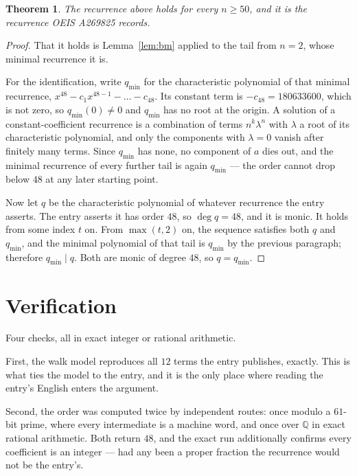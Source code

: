 \documentclass[11pt,a4paper]{article}
\theoremstyle{plain}
\newtheorem{theorem}{Theorem}
\theoremstyle{definition}
\begin{document}
\begin{theorem}
The recurrence above holds for every $n\ge50$, and it is the recurrence OEIS A269825 records.
\end{theorem}

\begin{proof}
That it holds is Lemma~\ref{lem:bm} applied to the tail from $n=2$, whose minimal
recurrence it is.

For the identification, write $q_{\min}$ for the characteristic polynomial of that minimal
recurrence, $x^{48}-c_1x^{48-1}-\dots-c_{48}$. Its constant term is
$-c_{48}=180633600$, which is not zero, so $q_{\min}(0)\neq0$ and $q_{\min}$ has no
root at the origin. A solution of a constant-coefficient recurrence is a combination of terms
$n^{k}\lambda^{n}$ with $\lambda$ a root of its characteristic polynomial, and only the
components with $\lambda=0$ vanish after finitely many terms. Since $q_{\min}$ has none, no
component of $a$ dies out, and the minimal recurrence of every further tail is again
$q_{\min}$ --- the order cannot drop below $48$ at any later starting point.

Now let $q$ be the characteristic polynomial of whatever recurrence the entry asserts. The
entry asserts it has order $48$, so $\deg q=48$, and it is monic. It holds from some
index $t$ on. From $\max(t,2)$ on, the sequence satisfies both $q$ and $q_{\min}$, and
the minimal polynomial of that tail is $q_{\min}$ by the previous paragraph; therefore
$q_{\min}\mid q$. Both are monic of degree $48$, so $q=q_{\min}$.
\end{proof}

\section{Verification}

Four checks, all in exact integer or rational arithmetic.

First, the walk model reproduces all $12$ terms the entry publishes, exactly. This is
what ties the model to the entry, and it is the only place where reading the entry's English
enters the argument.

Second, the order was computed twice by independent routes: once modulo a $61$-bit prime, where
every intermediate is a machine word, and once over $\mathbb{Q}$ in exact rational arithmetic.
Both return $48$, and the exact run additionally confirms every coefficient is an integer
--- had any been a proper fraction the recurrence would not be the entry's.
\end{document}
